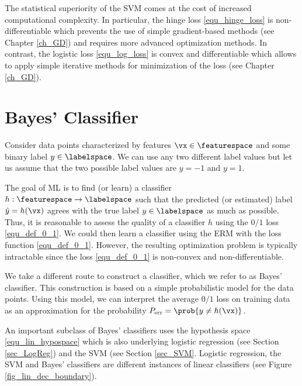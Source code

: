 \documentclass[12pt]{report}
\begin{document}
The statistical superiority of the SVM comes at the cost of increased computational 
complexity. In particular, the hinge loss \eqref{equ_hinge_loss} is non-differentiable 
which prevents the use of  simple gradient-based methods (see Chapter \ref{ch_GD}) 
and requires more advanced optimization methods. In contrast, the logistic loss \eqref{equ_log_loss} 
is convex and differentiable which allows to apply simple iterative methods for minimization 
of the loss (see Chapter \ref{ch_GD}). 


\section{Bayes' Classifier}
\label{sec_NaiveBayes}

Consider data points characterized by features $\vx \in \featurespace$ 
and some binary label $y \in \labelspace$. We can use any two different 
label values but let us assume that the two possible label values 
are $y=-1$ and $y=1$. 


The goal of ML is to find (or learn) a classifier $h: \featurespace \rightarrow \labelspace$ 
such that the predicted (or estimated) label $\hat{y} = h(\vx)$ agrees 
with the true label $y \in \labelspace$ as much as possible. Thus, it 
is reasonable to assess the quality of a classifier $h$ using the $0/1$ 
loss \eqref{equ_def_0_1}. We could then learn a classifier using the ERM 
with the loss function \eqref{equ_def_0_1}. However, the resulting 
optimization problem is typically intractable since the loss \eqref{equ_def_0_1} 
is non-convex and non-differentiable. 

We take a different route to construct a classifier, which we refer to 
as Bayes' classifier. This construction is based on a simple probabilistic 
model for the data points. Using this model, we can interpret the average 
$0/1$ loss on training data as an approximation for the probability 
$P_{\rm err} = \prob{ y \neq h(\vx) }$. 


An important subclass of Bayes' classifiers uses the hypothesis 
space \eqref{equ_lin_hypospace} which is also underlying logistic 
regression (see Section \ref{sec_LogReg}) and the SVM (see Section 
\ref{sec_SVM}. Logistic regression, the SVM and Bayes' 
classifiers are different instances of linear classifiers (see Figure \ref{fig_lin_dec_boundary}). 
\end{document}
